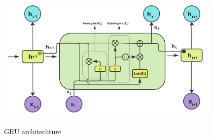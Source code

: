 \documentclass[preprint,12pt]{elsarticle}
\begin{document}
\begin{center}
	\begin{figure}[!htbp]
		\centering
		\includegraphics[width=11cm, height=7cm]{GRU.jpg}
		\caption{GRU architechture}
		\label{gru}
	\end{figure}
\end{center}
\end{document}

